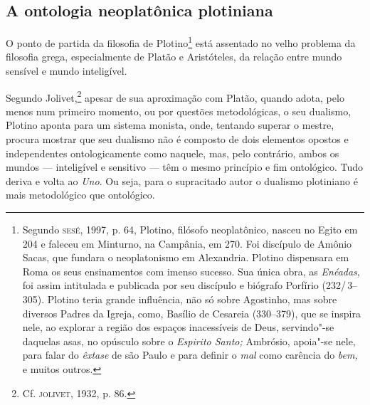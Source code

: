 \subsection{A ontologia neoplatônica plotiniana}

O ponto de partida da filosofia de Plotino\footnote{ Segundo
\textsc{sesé}, 1997, p. 64, Plotino, filósofo neoplatônico,  nasceu no
Egito em 204 e faleceu em Minturno, na Campânia, em 270. Foi
discípulo de Amônio Sacas, que fundara o neoplatonismo em
Alexandria. Plotino dispensara em Roma os seus ensinamentos com
imenso sucesso. Sua única obra, as \emph{Enéadas},  foi assim
intitulada e publicada por seu discípulo e biógrafo Porfírio
(232/\,3--305). Plotino teria grande influência, não só sobre
Agostinho, mas sobre diversos Padres da Igreja, como, Basílio de
Cesareia (330--379), que se inspira nele, ao explorar a região
dos espaços inacessíveis de Deus, servindo"-se daquelas asas, no
opúsculo sobre o \emph{Espirito Santo;} Ambrósio, apoia"-se
nele, para falar do \emph{êxtase} de são Paulo e para definir
o \emph{mal} como carência do \emph{bem,} e muitos outros.}
está assentado no velho problema da filosofia grega, 
especialmente de Platão e Aristóteles, da relação entre mundo
sensível e mundo inteligível.

Segundo Jolivet,\footnote{ Cf. \textsc{jolivet}, 1932, p. 86.} apesar de
sua aproximação com Platão, quando adota, pelo menos num
primeiro momento, ou por questões metodológicas, o seu dualismo,
Plotino aponta para um sistema monista, onde, tentando superar o
mestre, procura mostrar que seu dualismo não é composto de dois
elementos opostos e independentes ontologicamente como naquele, 
mas, pelo contrário, ambos os mundos --- inteligível e sensitivo ---
têm o mesmo princípio e fim ontológico. Tudo deriva e volta ao
\emph{Uno}. Ou seja, para o supracitado autor o dualismo
plotiniano é mais metodológico que ontológico.


